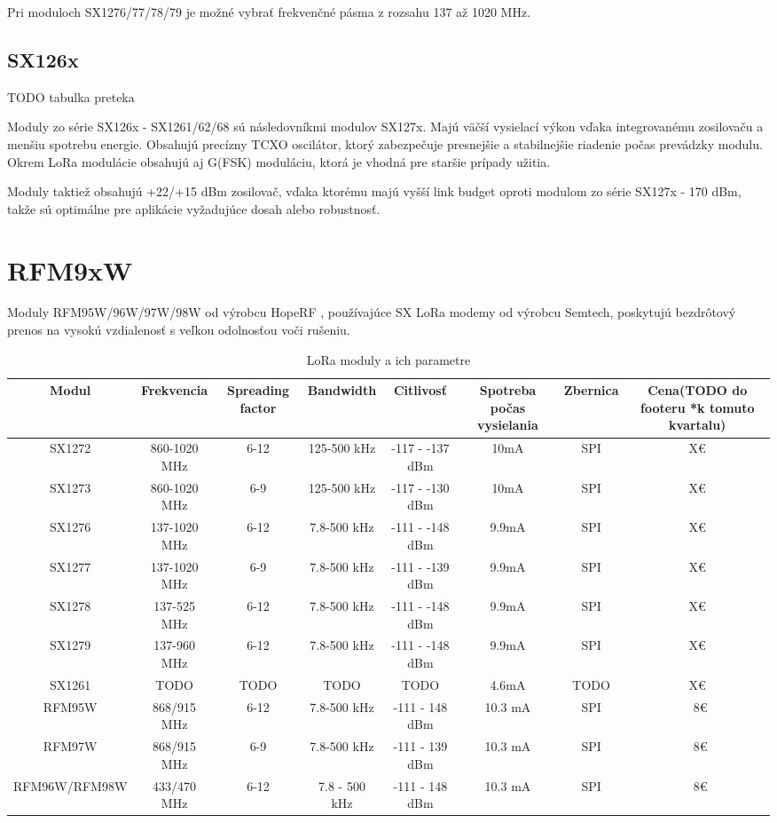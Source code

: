 \documentclass[czech,master]{diploma}
\begin{document}
Pri moduloch SX1276/77/78/79 je možné vybrať frekvenčné pásma z rozsahu 137 až 1020 MHz.

\subsection{SX126x}
TODO tabulka preteka

Moduly zo série SX126x - SX1261/62/68 sú následovníkmi modulov SX127x. Majú väčší vysielací výkon vďaka integrovanému zosilovaču a menšiu spotrebu energie. Obsahujú precízny TCXO oscilátor, 
ktorý zabezpečuje presnejšie a stabilnejšie riadenie počas prevádzky modulu. Okrem LoRa modulácie obsahujú aj G(FSK) moduláciu, ktorá je vhodná pre staršie 
prípady užitia.

Moduly taktiež obsahujú +22/+15 dBm zosilovač, vďaka ktorému majú vyšší link budget oproti modulom zo série SX127x - 170 dBm,
takže sú optimálne pre aplikácie vyžadujúce dosah alebo robustnosť.

\section{RFM9xW}
Moduly RFM95W/96W/97W/98W od výrobcu HopeRF \cite{hoperf}, používajúce SX LoRa modemy od výrobcu Semtech, poskytujú bezdrôtový prenos na 
vysokú vzdialenosť s veľkou odolnosťou voči rušeniu.
\begin{table}
	\centering
  \small
  \setlength\tabcolsep{2pt}
	\caption[Parametre LoRa modulov]{LoRa moduly a ich parametre}
  \begin{tabular}{c|c|c|c|c|c|c|c}
    \toprule %
    Modul & Frekvencia & Spreading factor & Bandwidth & Citlivosť & Spotreba počas vysielania & Zbernica & Cena(TODO do footeru *k tomuto kvartalu)\\
    \midrule
    SX1272 & 860-1020 MHz & 6-12 & 125-500 kHz & -117 - -137 dBm & 10mA & SPI & X€ \\ 
    SX1273 & 860-1020 MHz & 6-9 & 125-500 kHz & -117 - -130 dBm & 10mA & SPI & X€ \\
    SX1276 & 137-1020 MHz & 6-12 & 7.8-500 kHz & -111 - -148 dBm & 9.9mA & SPI & X€ \\
    SX1277 & 137-1020 MHz & 6-9 & 7.8-500 kHz & -111 - -139 dBm & 9.9mA & SPI & X€ \\
    SX1278 & 137-525 MHz & 6-12 & 7.8-500 kHz & -111 - -148 dBm & 9.9mA & SPI & X€ \\
    SX1279 & 137-960 MHz & 6-12 & 7.8-500 kHz & -111 - -148 dBm & 9.9mA & SPI & X€ \\
    SX1261 & TODO & TODO & TODO & TODO & 4.6mA & TODO & X€ \\
    RFM95W & 868/915 MHz & 6-12 & 7.8-500 kHz & -111 - 148 dBm & 10.3 mA & SPI & ~8€ \\
    RFM97W & 868/915 MHz & 6-9 & 7.8-500 kHz & -111 - 139 dBm & 10.3 mA & SPI & ~8€ \\
    RFM96W/RFM98W & 433/470 MHz & 6-12 & 7.8 - 500 kHz & -111 - 148 dBm & 10.3 mA & SPI & ~8€ \\
    \midrule
  \end{tabular}
\end{table}
\end{document}
